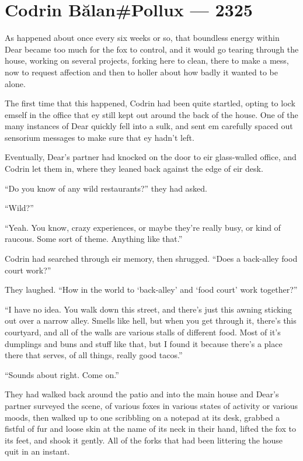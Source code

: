 \hypertarget{codrin-bux103lanpollux-2325}{%
\chapter{Codrin Bălan\#Pollux — 2325}\label{codrin-bux103lanpollux-2325}}

As happened about once every six weeks or so, that boundless energy within Dear became too much for the fox to control, and it would go tearing through the house, working on several projects, forking here to clean, there to make a mess, now to request affection and then to holler about how badly it wanted to be alone.

The first time that this happened, Codrin had been quite startled, opting to lock emself in the office that ey still kept out around the back of the house. One of the many instances of Dear quickly fell into a sulk, and sent em carefully spaced out sensorium messages to make sure that ey hadn't left.

Eventually, Dear's partner had knocked on the door to eir glass-walled office, and Codrin let them in, where they leaned back against the edge of eir desk.

``Do you know of any wild restaurants?'' they had asked.

``Wild?''

``Yeah. You know, crazy experiences, or maybe they're really busy, or kind of raucous. Some sort of theme. Anything like that.''

Codrin had searched through eir memory, then shrugged. ``Does a back-alley food court work?''

They laughed. ``How in the world to `back-alley' and `food court' work together?''

``I have no idea. You walk down this street, and there's just this awning sticking out over a narrow alley. Smells like hell, but when you get through it, there's this courtyard, and all of the walls are various stalls of different food. Most of it's dumplings and buns and stuff like that, but I found it because there's a place there that serves, of all things, really good tacos.''

``Sounds about right. Come on.''

They had walked back around the patio and into the main house and Dear's partner surveyed the scene, of various foxes in various states of activity or various moods, then walked up to one scribbling on a notepad at its desk, grabbed a fistful of fur and loose skin at the name of its neck in their hand, lifted the fox to its feet, and shook it gently. All of the forks that had been littering the house quit in an instant.


